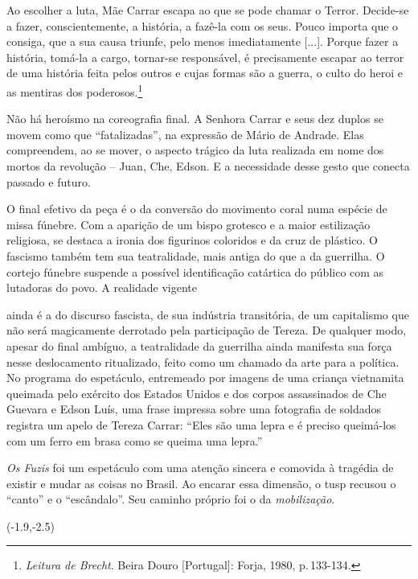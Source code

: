 \startblockquote
Ao escolher a luta, Mãe Carrar escapa ao que se pode chamar o Terror.
Decide-se a fazer, conscientemente, a história, a fazê-la com os seus.
Pouco importa que o consiga, que a sua causa triunfe, pelo menos
imediatamente {[}...{]}. Porque fazer a história, tomá-la a cargo,
tornar-se responsável, é precisamente escapar ao terror de uma história
feita pelos outros e cujas formas são a guerra, o culto do heroi e as
mentiras dos poderosos.\footnote{{\it Leitura de Brecht}. Beira Douro
  {[}Portugal{]}: Forja, 1980, p.\,133-134.}
\stopblockquote

Não há heroísmo na coreografia final. A Senhora Carrar e seus dez duplos
se movem como que “fatalizadas”, na expressão de Mário de Andrade. Elas
compreendem, ao se mover, o aspecto trágico da luta realizada em nome
dos mortos da revolução -- Juan, Che, Edson. E a necessidade desse gesto
que conecta passado e futuro.

O final efetivo da peça é o da conversão do movimento coral numa espécie
de missa fúnebre. Com a aparição de um bispo grotesco e a maior
estilização religiosa, se destaca a ironia dos figurinos coloridos e da
cruz de plástico. O fascismo também tem sua teatralidade, mais antiga do
que a da guerrilha. O cortejo fúnebre suspende a possível identificação
catártica do público com as lutadoras do povo. A realidade vigente

\column

\noindent{}ainda
é a do discurso fascista, de sua indústria transitória, de um
capitalismo que não será magicamente derrotado pela participação de
Tereza. De qualquer modo, apesar do final ambíguo, a teatralidade da
guerrilha ainda manifesta sua força nesse deslocamento ritualizado,
feito como um chamado da arte para a política. No programa do
espetáculo, entremeado por imagens de uma criança vietnamita queimada
pelo exército dos Estados Unidos e dos corpos assassinados de Che
Guevara e Edson Luís, uma frase impressa sobre uma fotografia de
soldados registra um apelo de Tereza Carrar: “Eles são uma lepra e é
preciso queimá-los com um ferro em brasa como se queima uma lepra.”

{\it Os Fuzis} foi um espetáculo com uma atenção sincera e comovida à
tragédia de existir e mudar as coisas no Brasil. Ao encarar essa
dimensão, o {\sc tusp} recusou o “canto” e o “escândalo”. Seu caminho próprio
foi o da {\it mobilização}.

\startpositioning
   \position(-1.9,-2.5){}
\stoppositioning   


